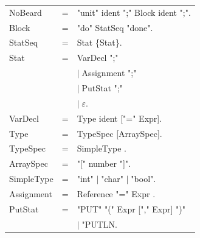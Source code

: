 \documentclass[11pt]{report}
\newenvironment{grammar}
	{\begin{tabular}[b]{lcl}}
	{\end{tabular}}
\newcommand{\alternative}{$\mid \;$}
\newcommand{\emptystring}{$\varepsilon$}
\begin{document}
	\begin{grammar}
	NoBeard & = & "unit" ident ";" Block ident ";".\\
	
	Block & = &  "do" StatSeq "done".\\
	
	StatSeq & = & Stat \{Stat\}. \\
	
	Stat & = & VarDecl ";" \\
	&& \alternative Assignment ";"\\
	&& \alternative PutStat ";" \\
	&& \alternative \emptystring. \\
	
	VarDecl & = & Type ident ["=" Expr]. \\
	
	Type & = & TypeSpec [ArraySpec]. \\
	
	TypeSpec & = & SimpleType %
	. \\
	
	ArraySpec & = & "[" number "]". \\
	
	SimpleType & = & "int" \alternative "char" \alternative "bool". \\
	
	
	
	
	
	
	Assignment &=& Reference "=" Expr . \\
	
	
	PutStat & = & "PUT" "(" Expr ["," Expr] ")" \\
	&& \alternative "PUTLN. \\
	

\end{grammar}
\end{document}
